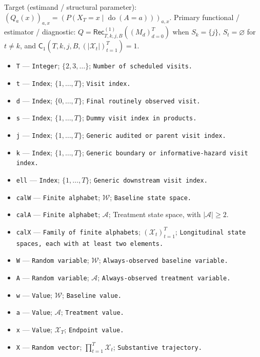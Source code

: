 \documentclass{article}
\begin{document}
Target (estimand / structural parameter): \((Q_a(x))_{a,x}=(P(X_T=x\mid\operatorname{do}(A=a)))_{a,x}\).
Primary functional / estimator / diagnostic: \(Q=\mathsf{Rec}^{(1)}_{T,k,j,B}((M_d)_{d=0}^T)\) when \(S_k=\{j\}\), \(S_t=\varnothing\) for \(t\ne k\), and \(\mathsf C_1(T,k,j,B,(|\mathcal X_t|)_{t=1}^T)=1\).
\begin{itemize}
  \item \texttt{T} --- \texttt{Integer}; \(\{2,3,\ldots\}\); \texttt{Number of scheduled visits.}
  \item \texttt{t} --- \texttt{Index}; \(\{1,\ldots,T\}\); \texttt{Visit index.}
  \item \texttt{d} --- \texttt{Index}; \(\{0,\ldots,T\}\); \texttt{Final routinely observed visit.}
  \item \texttt{s} --- \texttt{Index}; \(\{1,\ldots,T\}\); \texttt{Dummy visit index in products.}
  \item \texttt{j} --- \texttt{Index}; \(\{1,\ldots,T\}\); \texttt{Generic audited or parent visit index.}
  \item \texttt{k} --- \texttt{Index}; \(\{1,\ldots,T\}\); \texttt{Generic boundary or informative-\allowbreak{}hazard visit index.}
  \item \texttt{ell} --- \texttt{Index}; \(\{1,\ldots,T\}\); \texttt{Generic downstream visit index.}
  \item \texttt{calW} --- \texttt{Finite alphabet}; \(\mathcal W\); \texttt{Baseline state space.}
  \item \texttt{calA} --- \texttt{Finite alphabet}; \(\mathcal A\); Treatment state space, with \( |\mathcal A|\ge 2\).
  \item \texttt{calX} --- \texttt{Family of finite alphabets}; \((\mathcal X_t)_{t=1}^T\); \texttt{Longitudinal state spaces,\allowbreak{} each with at least two elements.}
  \item \texttt{W} --- \texttt{Random variable}; \(\mathcal W\); \texttt{Always-\allowbreak{}observed baseline variable.}
  \item \texttt{A} --- \texttt{Random variable}; \(\mathcal A\); \texttt{Always-\allowbreak{}observed treatment variable.}
  \item \texttt{w} --- \texttt{Value}; \(\mathcal W\); \texttt{Baseline value.}
  \item \texttt{a} --- \texttt{Value}; \(\mathcal A\); \texttt{Treatment value.}
  \item \texttt{x} --- \texttt{Value}; \(\mathcal X_T\); \texttt{Endpoint value.}
  \item \texttt{X} --- \texttt{Random vector}; \(\prod_{t=1}^T\mathcal X_t\); \texttt{Substantive trajectory.}

\end{itemize}
\end{document}
